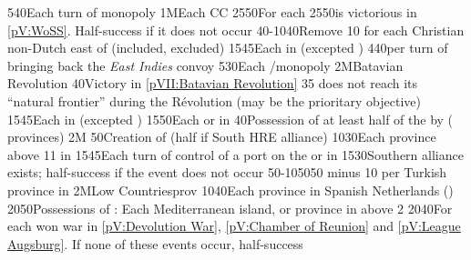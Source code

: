 {5}{40}{Each turn of  monopoly}%
%
%
\EUobjective1M{Each \CC}{CC}%
{25}{50}{For each }%
%
%
{25}{50}{\HOL is victorious in \ref{pV:WoSS}. Half-success if it does not
  occur}%
%
%
{40-10}{40}{Remove 10 \VPs for each Christian non-Dutch \TP east of
   (included, \continentSiberia excluded)}%
%
%
{15}{45}{Each \COL in  (excepted )}%
%
%
{4}{40}{per turn of bringing back the \emph{East Indies} convoy}%
%
%
%
{5}{30}{Each \CTZ/\STZ monopoly}%
%
\EUobjective2M{Batavian Revolution}{}%
{}{40}{Victory in \ref{pVII:Batavian Revolution}}%
%
%
{}{35}{ does not reach its ``natural frontier'' during the
  Révolution (may be the prioritary objective)}%
%
%
{15}{45}{Each \COL in  (excepted )}%
%
%
{15}{50}{Each \COL or \TP in }%
%
 
%
%
{}{40}{Possession of at least half of the \payshongrie by \AUSaus (
  provinces)}%
%
\EUobjective2M{}{}%
{}{50}{Creation of  (half if South HRE alliance)}%
%
%
{10}{30}{Each province above 11 in \paysmajeurAutriche}%
%
%
{15}{45}{Each turn of control of a port on the \seazoneBaltique or in
  \payshanse}%
%
%
{15}{30}{Southern \HRE alliance exists; half-success if the event does not
  occur}%
%
%
%
{50-10}{50}{50 \VPs minus 10 \VPs per Turkish province in \payshongrie}%
%
\EUobjective2M{Low Countries}{prov}%
{10}{40}{Each province in Spanish Netherlands (\regionBelgique)}%
%
%
{20}{50}{Possessions of : Each Mediterranean island, or province
  in  above 2}%
%
%
{20}{40}{For each won war in \ref{pV:Devolution War}, \ref{pV:Chamber of
    Reunion} and \ref{pV:League Augsburg}. If none of these events occur,
  half-success}%
%
%
